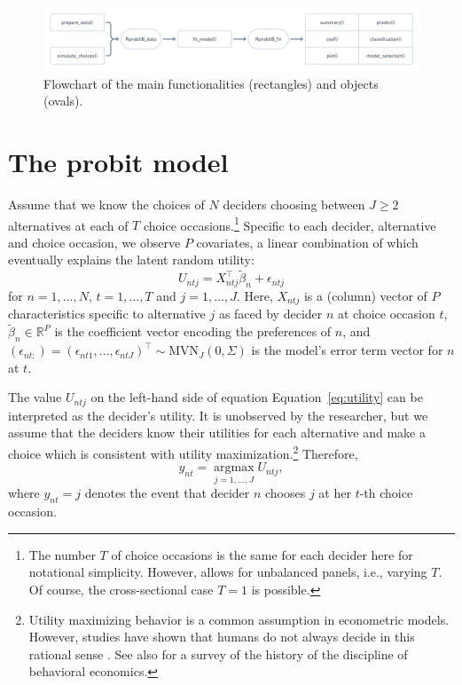 \documentclass[article,shortnames]{jss}
\begin{document}
\begin{figure}[!ht]
  \centering
  \includegraphics[width=1.0\textwidth]{flowchart.png}
  \caption{Flowchart of the main  functionalities (rectangles) and objects (ovals).}
  \label{fig:flowchart}
\end{figure}

\section{The probit model} \label{sec:probit_model}

Assume that we know the choices of $N$ deciders choosing between $J \geq 2$ alternatives at each of $T$ choice occasions.\footnote{The number $T$ of choice occasions is the same for each decider here for notational simplicity. However,  allows for unbalanced panels, i.e., varying $T$. Of course, the cross-sectional case $T = 1$ is possible.} Specific to each decider, alternative and choice occasion, we observe $P$ covariates, a linear combination of which eventually explains the latent random utility:
%
\begin{equation}
  \label{eq:utility}
  U_{ntj} = X_{ntj}^\top \tilde{\beta}_n + \epsilon_{ntj}
\end{equation}
%
for $n=1,\dots,N$, $t=1,\dots,T$ and $j=1,\dots,J$. Here, $X_{ntj}$ is a (column) vector of $P$ characteristics specific to alternative $j$ as faced by decider $n$ at choice occasion $t$, $\tilde{\beta}_n \in \mathbb{R}^{P}$ is the coefficient vector encoding the preferences of $n$, and $(\epsilon_{nt:}) = (\epsilon_{nt1},\dots,\epsilon_{ntJ})^\top \sim \text{MVN}_{J} (0,\Sigma)$ is the model's error term vector for $n$ at $t$.

The value $U_{ntj}$ on the left-hand side of equation Equation~\ref{eq:utility} can be interpreted as the decider's utility. It is unobserved by the researcher, but we assume that the deciders know their utilities for each alternative and make a choice which is consistent with utility maximization.\footnote{Utility maximizing behavior is a common assumption in econometric models. However, studies have shown that humans do not always decide in this rational sense \citep{Tversky:1986, Hewig:2011}. See also \citep{Thaler:2015} for a survey of the history of the discipline of behavioral economics.} Therefore,
%
\begin{equation}
   \label{eq:link}
   y_{nt} = \operatorname*{argmax}_{j = 1,\dots,J} U_{ntj},
\end{equation}
%
where $y_{nt}=j$ denotes the event that decider $n$ chooses $j$ at her $t$-th choice occasion.
\end{document}
